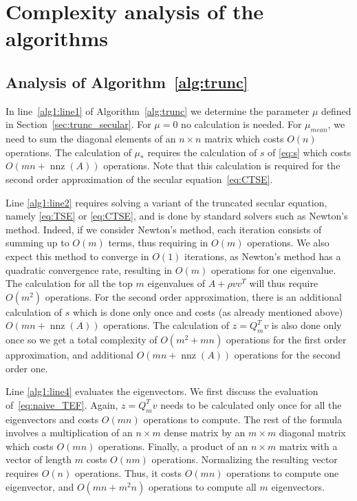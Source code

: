 \documentclass[11pt]{article}
\begin{document}
\section{Complexity analysis of the algorithms} \label{app:sec_complexity}

\subsection{Analysis of Algorithm~\ref{alg:trunc}} \label{sec:analysis_1}

In line~\ref{alg1:line1} of Algorithm~\ref{alg:trunc} we determine the parameter $\mu$ defined in Section~\ref{sec:trunc_secular}. For $\mu = 0$ no calculation is needed. For $\mu_{mean}$, we need to sum the diagonal elements of an $n\times n$ matrix which costs $O(n)$ operations. The calculation of $\mu_\ast$ requires the calculation of $s$ of \eqref{eq:s} which costs $O \left( mn + \operatorname{nnz}(A) \right)$ operations. Note that this calculation is required for the second order approximation of the secular equation~\eqref{eq:CTSE}. 

Line \ref{alg1:line2} requires solving a variant of the truncated secular equation, namely \eqref{eq:TSE} or \eqref{eq:CTSE}, and is done by standard solvers such as Newton's method. Indeed, if we consider Newton's method, each iteration consists of summing up to $O(m)$ terms, thus requiring in $O(m)$ operations. We also expect this method to converge in $O(1)$ iterations, as Newton's method has a quadratic convergence rate, resulting in $O(m)$ operations for one eigenvalue. The calculation for all the top $m$ eigenvalues of $A + \rho vv^T$ will thus require $O(m^2)$ operations. For the second order approximation, there is an additional calculation of $s$ which is done only once and costs (as already mentioned above) $O \left( mn + \operatorname{nnz}(A) \right)$ operations. The calculation of $z = Q_m^Tv$ is also done only once so we get a total complexity of $O \left( m^2 + mn \right)$ operations for the first order approximation, and additional $O \left( mn + \operatorname{nnz}(A) \right)$ operations for the second order one.

Line \ref{alg1:line4} evaluates the eigenvectors. We first discuss the evaluation of~\eqref{eq:naive_TEF}. Again, $z = Q_m^Tv$ needs to be calculated only once for all the eigenvectors and costs $O(mn)$ operations to compute. The rest of the formula involves a multiplication of an $n \times m$ dense matrix by an $m \times m$ diagonal matrix which costs $O(mn)$ operations. Finally, a product of an $n \times m$ matrix with a vector of length $m$ costs $O(nm)$ operations. Normalizing the resulting vector requires $O(n)$ operations. Thus, it costs $O(mn)$ operations to compute one eigenvector, and $O(mn + m^2n)$ operations to compute all $m$ eigenvectors.
\end{document}
